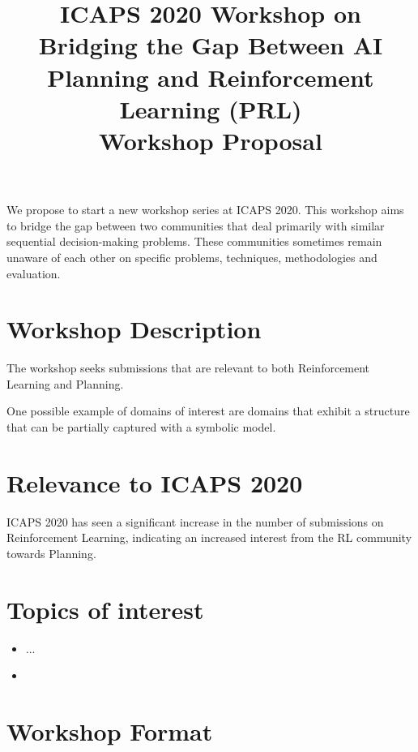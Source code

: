 \documentclass[10pt]{article}
\begin{document}
\title{ICAPS 2020 Workshop on \\ Bridging the Gap Between AI Planning and Reinforcement Learning (PRL)\\ \vspace*{0.7cm} Workshop Proposal
}
\date{}

\author{}

\maketitle


We propose to start a new workshop series at ICAPS 2020. This workshop aims to bridge the gap between two communities that deal primarily with similar sequential decision-making problems. These communities sometimes remain unaware of each other on specific problems, techniques,  methodologies and evaluation.

\section*{Workshop Description}

The workshop seeks submissions that are relevant to both Reinforcement Learning
and Planning. 


One possible example of domains of interest are domains that exhibit a structure
that can be partially captured with a symbolic model.



\section*{Relevance to ICAPS 2020}
ICAPS 2020 has seen a significant increase in the number of submissions on Reinforcement Learning, indicating an increased interest from the RL community towards Planning.

\section*{Topics of interest}

\begin{itemize}
\item ...
\item

\end{itemize}

\section*{Workshop Format}
\end{document}
